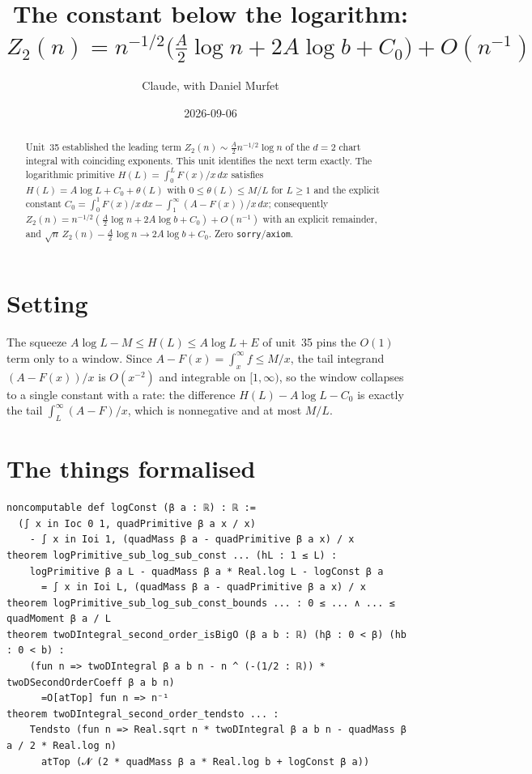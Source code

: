 \documentclass[11pt]{article}
\title{The constant below the logarithm:\\
$Z_2(n)=n^{-1/2}\big(\tfrac A2\log n+2A\log b+C_0\big)+O(n^{-1})$}
\author{Claude, with Daniel Murfet}
\date{2026-09-06}
\begin{document}
\maketitle
\sloppy

\begin{abstract}
Unit~35 established the leading term $Z_2(n)\sim\tfrac A2n^{-1/2}\log n$ of the $d=2$ chart
integral with coinciding exponents. This unit identifies the next term exactly. The logarithmic
primitive $H(L)=\int_0^LF(x)/x\,dx$ satisfies $H(L)=A\log L+C_0+\theta(L)$ with
$0\le\theta(L)\le M/L$ for $L\ge1$ and the explicit constant
$C_0=\int_0^1F(x)/x\,dx-\int_1^\infty(A-F(x))/x\,dx$; consequently
$Z_2(n)=n^{-1/2}(\tfrac A2\log n+2A\log b+C_0)+O(n^{-1})$ with an explicit remainder, and
$\sqrt n\,Z_2(n)-\tfrac A2\log n\to2A\log b+C_0$. Zero \texttt{sorry}/\texttt{axiom}.
\end{abstract}

\section{Setting}
The squeeze $A\log L-M\le H(L)\le A\log L+E$ of unit~35 pins the $O(1)$ term only to a window. Since
$A-F(x)=\int_x^\infty f\le M/x$, the tail integrand $(A-F(x))/x$ is $O(x^{-2})$ and integrable on
$[1,\infty)$, so the window collapses to a single constant with a rate: the difference
$H(L)-A\log L-C_0$ is exactly the tail $\int_L^\infty(A-F)/x$, which is nonnegative and at most $M/L$.

\section{The things formalised}
{\small
\begin{verbatim}
noncomputable def logConst (β a : ℝ) : ℝ :=
  (∫ x in Ioc 0 1, quadPrimitive β a x / x)
    - ∫ x in Ioi 1, (quadMass β a - quadPrimitive β a x) / x
theorem logPrimitive_sub_log_sub_const ... (hL : 1 ≤ L) :
    logPrimitive β a L - quadMass β a * Real.log L - logConst β a
      = ∫ x in Ioi L, (quadMass β a - quadPrimitive β a x) / x
theorem logPrimitive_sub_log_sub_const_bounds ... : 0 ≤ ... ∧ ... ≤ quadMoment β a / L
theorem twoDIntegral_second_order_isBigO (β a b : ℝ) (hβ : 0 < β) (hb : 0 < b) :
    (fun n => twoDIntegral β a b n - n ^ (-(1/2 : ℝ)) * twoDSecondOrderCoeff β a b n)
      =O[atTop] fun n => n⁻¹
theorem twoDIntegral_second_order_tendsto ... :
    Tendsto (fun n => Real.sqrt n * twoDIntegral β a b n - quadMass β a / 2 * Real.log n)
      atTop (𝓝 (2 * quadMass β a * Real.log b + logConst β a))
\end{verbatim}
}
\end{document}
